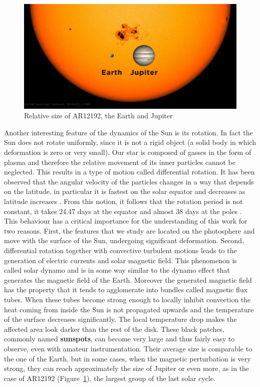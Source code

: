 \begin{figure}[t]
    \centering
    \includegraphics[width=\textwidth]{./pictures/AR12192-jup-earth}
    \caption{Relative size of AR12192, the Earth and Jupiter}
    \label{fig:AR12192-comp}
\end{figure}
\bigbreak
\noindent Another interesting feature of the dynamics of the Sun is its rotation. In fact the Sun does not rotate uniformly, since it is not a rigid object (a solid body in which deformation is zero or very small). Our star is composed of gasses in the form of plasma and therefore the relative movement of its inner particles cannot be neglected. This results in a type of motion called differential rotation. It has been observed that the angular velocity of the particles changes in a way that depends on the latitude, in particular it is fastest on the solar equator and decreases as latitude increases \cite{diffrot}.
\bigbreak
\noindent From this notion, it follows that the rotation period is not constant, it takes 24.47 days at the equator and almost 38 days at the poles \cite{diffrotrev}. This behaviour has a critical importance for the understanding of this work for two reasons. First, the features that we study are located on the photosphere and move with the surface of the Sun, undergoing significant deformation. Second, differential rotation together with convective turbulent motions leads to the generation of electric currents and solar magnetic field. This phenomenon is called solar dynamo and is in some way similar to the dynamo effect that generates the magnetic field of the Earth. Moreover the generated magnetic field has the property that it tends to agglomerate into bundles called magnetic flux tubes.
\bigbreak
\noindent When these tubes become strong enough to locally inhibit convection the heat coming from inside the Sun is not propagated upwards and the temperature of the surface decreases significantly. The local temperature drop makes the affected area look darker than the rest of the disk. These black patches, commonly named \textbf{sunspots}, can become very large and thus fairly easy to observe, even with amateur instrumentation. Their average size is comparable to the one of the Earth, but in some cases, when the magnetic perturbation is very strong, they can reach approximately the size of Jupiter or even more, as in the case of AR12192 (Figure~\ref{fig:AR12192-comp}), the largest group of the last solar cycle.
